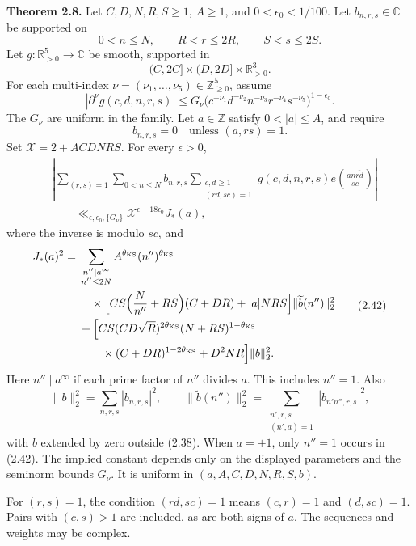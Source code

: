 \textbf{Theorem 2.8.}\label{p1:thm:T} Let $C,D,N,R,S\geq1$, $A\geq1$, and $0<\epsilon_0<1/100$. Let $b_{n,r,s}\in\mathbb C$ be supported on
\[
 0<n\leq N,\qquad R<r\leq2R,\qquad S<s\leq2S.
\tag{2.38}\label{p1:eq:2.38}
\]
Let $g:\mathbb R_{>0}^5\longrightarrow\mathbb C$ be smooth, supported in
\[
 (C,2C]\times(D,2D]\times\mathbb R_{>0}^3.
\]
For each multi-index $\nu=(\nu_1,\ldots,\nu_5)\in\mathbb Z_{\geq0}^5$, assume
\[
 |\partial^\nu g(c,d,n,r,s)|
 \leq G_\nu
 \bigl(c^{-\nu_1}d^{-\nu_2}n^{-\nu_3}r^{-\nu_4}s^{-\nu_5}\bigr)^{1-\epsilon_0}.
\tag{2.39}\label{p1:eq:2.39}
\]
The $G_\nu$ are uniform in the family. Let $a\in\mathbb Z$ satisfy $0<|a|\leq A$, and require
\[
 b_{n,r,s}=0\quad\text{unless }(a,rs)=1.
\tag{2.40}\label{p1:eq:2.40}
\]
Set $\mathcal X=2+ACDNRS$. For every $\epsilon>0$,
\[
\begin{split}
 &\left|\sum_{(r,s)=1}\sum_{0<n\leq N}b_{n,r,s}
 \sum_{\substack{c,d\geq1\\(rd,sc)=1}}
 g(c,d,n,r,s)e\!\left(\frac{an\overline{rd}}{sc}\right)\right|\\
 &\qquad\ll_{\epsilon,\epsilon_0,\{G_\nu\}}
 \mathcal X^{\epsilon+18\epsilon_0}J_*(a),
\end{split}
\tag{2.41}\label{p1:eq:2.41}
\]
where the inverse is modulo $sc$, and
\[
\begin{aligned}
 J_*(a)^2={}&
 \sum_{\substack{n''\mid a^\infty\\n''\leq2N}}
 A^{\theta_{\mathrm{KS}}}(n'')^{\theta_{\mathrm{KS}}}\\
 &\quad\times\Bigl[CS\Bigl(\frac N{n''}+RS\Bigr)(C+DR)
 +|a|NRS\Bigr]\|\widetilde b(n'')\|_2^2\\
 &+\Bigl[CS(CD\sqrt R)^{2\theta_{\mathrm{KS}}}
 (N+RS)^{1-\theta_{\mathrm{KS}}}\\
 &\qquad\times(C+DR)^{1-2\theta_{\mathrm{KS}}}
 +D^2NR\Bigr]\|b\|_2^2.
\end{aligned}
\tag{2.42}\label{p1:eq:2.42}
\]
Here $n''\mid a^\infty$ if each prime factor of $n''$ divides $a$. This includes $n''=1$. Also
\[
 \|b\|_2^2=\sum_{n,r,s}|b_{n,r,s}|^2,\qquad
 \|\widetilde b(n'')\|_2^2
 =\sum_{\substack{n',r,s\\(n',a)=1}}|b_{n'n'',r,s}|^2,
\tag{2.43}\label{p1:eq:2.43}
\]
with $b$ extended by zero outside (2.38). When $a=\pm1$, only $n''=1$ occurs in (2.42). The implied constant depends only on the displayed parameters and the seminorm bounds $G_\nu$. It is uniform in $(a,A,C,D,N,R,S,b)$.

For $(r,s)=1$, the condition $(rd,sc)=1$ means $(c,r)=1$ and $(d,sc)=1$. Pairs with $(c,s)>1$ are included, as are both signs of $a$. The sequences and weights may be complex.

